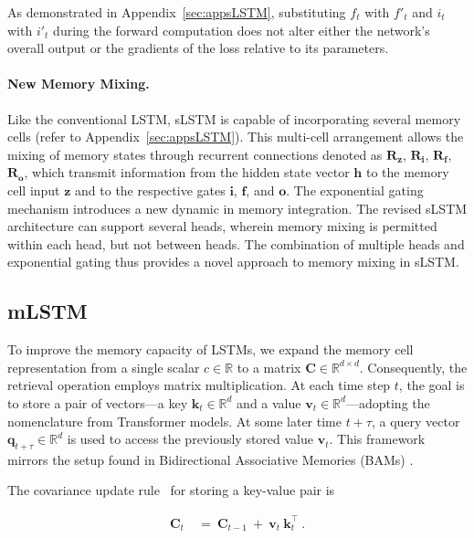 As demonstrated in Appendix~\ref{sec:appsLSTM}, substituting $f_t$ with $f'_t$ and $i_t$ with $i'_t$ during the forward computation does not alter either the network’s overall output or the gradients of the loss relative to its parameters.

\paragraph{New Memory Mixing.} Like the conventional LSTM, sLSTM is capable of incorporating several memory cells (refer to Appendix~\ref{sec:appsLSTM}). This multi-cell arrangement allows the mixing of memory states through recurrent connections denoted as $\mathbf{R}_{\mathbf{z}}$, $\mathbf{R}_{\mathbf{i}}$, $\mathbf{R}_{\mathbf{f}}$, $\mathbf{R}_{\mathbf{o}}$, which transmit information from the hidden state vector $\mathbf{h}$ to the memory cell input $\mathbf{z}$ and to the respective gates $\mathbf{i}$, $\mathbf{f}$, and $\mathbf{o}$. The exponential gating mechanism introduces a new dynamic in memory integration. The revised sLSTM architecture can support several heads, wherein memory mixing is permitted within each head, but not between heads. The combination of multiple heads and exponential gating thus provides a novel approach to memory mixing in sLSTM.

\subsection{mLSTM}
\label{sec:mLSTM}

To improve the memory capacity of LSTMs, we expand the memory cell representation from a single scalar $c \in \mathbb{R}$ to a matrix $\mathbf{C} \in \mathbb{R}^{d \times d}$. Consequently, the retrieval operation employs matrix multiplication. At each time step $t$, the goal is to store a pair of vectors—a key $\mathbf{k}_t \in \mathbb{R}^d$ and a value $\mathbf{v}_t \in \mathbb{R}^d$—adopting the nomenclature from Transformer models. At some later time $t + \tau$, a query vector $\mathbf{q}_{t+\tau} \in \mathbb{R}^d$ is used to access the previously stored value $\mathbf{v}_t$. This framework mirrors the setup found in Bidirectional Associative Memories (BAMs) \citep{Kohonen:72,Anderson:72,Nakano:72,Anderson:77}.

The covariance update rule~\citep{Sejnowski:77,Dayan:91} for storing a key-value pair is

\begin{align}
\mathbf{C}_t \ &= \ \mathbf{C}_{t-1} \ + \ \mathbf{v}_{t} \ \mathbf{k}_t^\top \ .
\end{align}

